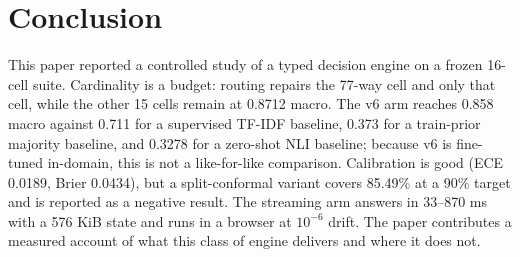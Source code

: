 \section{Conclusion}
\label{sec:conclusion}

This paper reported a controlled study of a typed decision engine on a frozen 16-cell suite. Cardinality is a budget: routing repairs the 77-way cell and only that cell, while the other 15 cells remain at 0.8712 macro. The v6 arm reaches 0.858 macro against 0.711 for a supervised TF-IDF baseline, 0.373 for a train-prior majority baseline, and 0.3278 for a zero-shot NLI baseline; because v6 is fine-tuned in-domain, this is not a like-for-like comparison. Calibration is good (ECE 0.0189, Brier 0.0434), but a split-conformal variant covers 85.49\% at a 90\% target and is reported as a negative result. The streaming arm answers in 33--870 ms with a 576 KiB state and runs in a browser at $10^{-6}$ drift. The paper contributes a measured account of what this class of engine delivers and where it does not.
